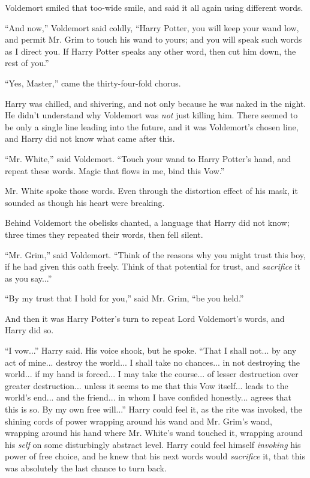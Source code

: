 Voldemort smiled that too-wide smile, and said it all again using different words.

``And now,'' Voldemort said coldly, ``Harry Potter, you will keep your wand low, and permit Mr. Grim to touch his wand to yours; and you will speak such words as I direct you. If Harry Potter speaks any other word, then cut him down, the rest of you.''

``Yes, Master,'' came the thirty-four-fold chorus.

Harry was chilled, and shivering, and not only because he was naked in the night. He didn't understand why Voldemort was \emph{not} just killing him. There seemed to be only a single line leading into the future, and it was Voldemort's chosen line, and Harry did not know what came after this.

``Mr. White,'' said Voldemort. ``Touch your wand to Harry Potter's hand, and repeat these words. Magic that flows in me, bind this Vow.''

Mr. White spoke those words. Even through the distortion effect of his mask, it sounded as though his heart were breaking.

Behind Voldemort the obelisks chanted, a language that Harry did not know; three times they repeated their words, then fell silent.

``Mr. Grim,'' said Voldemort. ``Think of the reasons why you might trust this boy, if he had given this oath freely. Think of that potential for trust, and \emph{sacrifice} it as you say...''

``By my trust that I hold for you,'' said Mr. Grim, ``be you held.''

And then it was Harry Potter's turn to repeat Lord Voldemort's words, and Harry did so.

``I vow...'' Harry said. His voice shook, but he spoke. ``That I shall not... by any act of mine... destroy the world... I shall take no chances... in not destroying the world... if my hand is forced... I may take the course... of lesser destruction over greater destruction... unless it seems to me that this Vow itself... leads to the world's end... and the friend... in whom I have confided honestly... agrees that this is so. By my own free will...'' Harry could feel it, as the rite was invoked, the shining cords of power wrapping around his wand and Mr. Grim's wand, wrapping around his hand where Mr. White's wand touched it, wrapping around his \emph{self} on some disturbingly abstract level. Harry could feel himself \emph{invoking} his power of free choice, and he knew that his next words would \emph{sacrifice} it, that this was absolutely the last chance to turn back.

